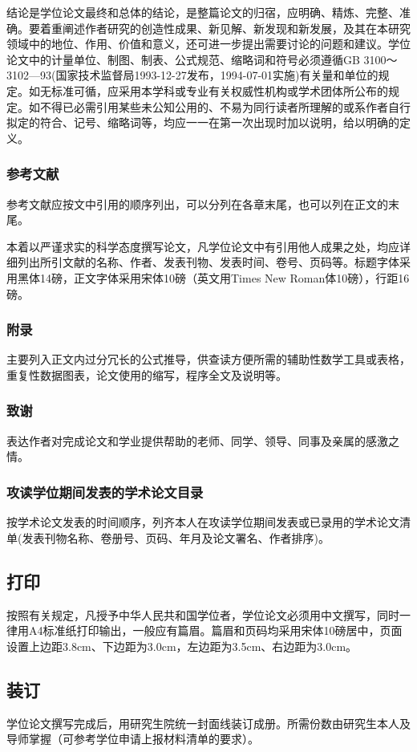 结论是学位论文最终和总体的结论，是整篇论文的归宿，应明确、精炼、完整、准确。要着重阐述作者研究的创造性成果、新见解、新发现和新发展，及其在本研究领域中的地位、作用、价值和意义，还可进一步提出需要讨论的问题和建议。学位论文中的计量单位、制图、制表、公式规范、缩略词和符号必须遵循GB 3100～3102—93(国家技术监督局1993-12-27发布，1994-07-01实施)有关量和单位的规定。如无标准可循，应采用本学科或专业有关权威性机构或学术团体所公布的规定。如不得已必需引用某些未公知公用的、不易为同行读者所理解的或系作者自行拟定的符合、记号、缩略词等，均应一一在第一次出现时加以说明，给以明确的定义。

\subsubsection{参考文献}

参考文献应按文中引用的顺序列出，可以分列在各章末尾，也可以列在正文的末尾。

本着以严谨求实的科学态度撰写论文，凡学位论文中有引用他人成果之处，均应详细列出所引文献的名称、作者、发表刊物、发表时间、卷号、页码等。标题字体采用黑体14磅，正文字体采用宋体10磅（英文用Times New Roman体10磅），行距16磅。

\subsubsection{附录}
主要列入正文内过分冗长的公式推导，供查读方便所需的辅助性数学工具或表格，重复性数据图表，论文使用的缩写，程序全文及说明等。

\subsubsection{致谢}

表达作者对完成论文和学业提供帮助的老师、同学、领导、同事及亲属的感激之情。

\subsubsection{攻读学位期间发表的学术论文目录}

按学术论文发表的时间顺序，列齐本人在攻读学位期间发表或已录用的学术论文清单(发表刊物名称、卷册号、页码、年月及论文署名、作者排序)。

\subsection{打印}

按照有关规定，凡授予中华人民共和国学位者，学位论文必须用中文撰写，同时一律用A4标准纸打印输出，一般应有篇眉。篇眉和页码均采用宋体10磅居中，页面设置上边距3.8cm、下边距为3.0cm，左边距为3.5cm、右边距为3.0cm。

\subsection{装订}

学位论文撰写完成后，用研究生院统一封面线装订成册。所需份数由研究生本人及导师掌握（可参考学位申请上报材料清单的要求）。
